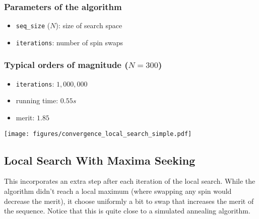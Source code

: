 \documentclass{article}
\begin{document}
  \begin{multicols}{2}

    \subsubsection*{Parameters of the algorithm}
      \begin{itemize}
        \item \texttt{seq\_size} ($N$): size of search space
        \item \texttt{iterations}: number of spin swaps
      \end{itemize}

    \subsubsection*{Typical orders of magnitude ($N = 300$)}

      \begin{itemize}
        \item \texttt{iterations}: $1,000,000$
        \item running time: $0.55s$
        \item merit: $1.85$
      \end{itemize}

    \vphantom{0}

  \columnbreak

    \texttt{[image: figures/convergence\_local\_search\_simple.pdf]}

  \end{multicols}

\subsection{Local Search With Maxima Seeking}

  This incorporates an extra step after each iteration of the local search.
  While the algorithm didn't reach a local maximum (where swapping any spin
  would decrease the merit), it choose uniformly a bit to swap that increases
  the merit of the sequence. Notice that this is quite close to a simulated
  annealing algorithm.
\end{document}
